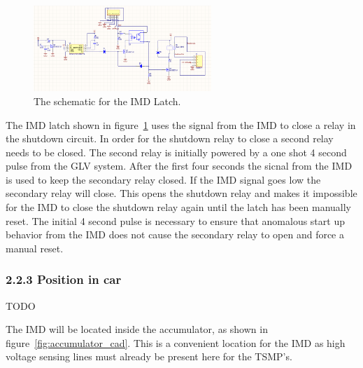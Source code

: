 \documentclass{article}
\begin{document}

\begin{figure} [!ht]
	\centering  %
	
	\includegraphics[width=0.6\textwidth]{IMD_Latch_Rev2_AltiumSchematic.png}
	
	\caption{The schematic for the IMD Latch.}
	
	\label{fig:IMDLatch_Schematic}
\end{figure}

The IMD latch shown in figure~\ref{fig:IMDLatch_Schematic} uses the signal from the IMD to close a relay in the shutdown circuit. In order for the shutdown relay to close a second relay needs to be closed. The second relay is initially powered by a one shot 4 second pulse from the GLV system. After the first four seconds the sicnal from the IMD is used to keep the secondary relay closed. If the IMD signal goes low the secondary relay will close. This opens the shutdown relay and makes it impossible for the IMD to close the shutdown relay again until the latch has been manually reset. The initial 4 second pulse is necessary to ensure that anomalous start up behavior from the IMD does not cause the secondary relay to open and force a manual reset.


\subsubsection*{2.2.3 Position in car}
TODO

The IMD will be located inside the accumulator, as shown in figure~\ref{fig:accumulator_cad}. This is a convenient location for the IMD as high voltage sensing lines must already be present here for the TSMP’s.
\end{document}
